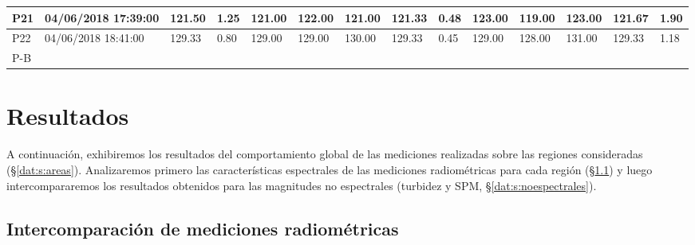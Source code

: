 \begin{table}
\begin{adjustbox}{angle=90}
\begin{tabular}{|l|l|l|l|l|l|l|l|l|l|l|l|l|l|}
        P21 & 04/06/2018 17:39:00 & 121.50 & 1.25 & 121.00 & 122.00 & 121.00 & 121.33 & 0.48 & 123.00 & 119.00 & 123.00 & 121.67 & 1.90 \\ \hline
        P22 & 04/06/2018 18:41:00 & 129.33 & 0.80 & 129.00 & 129.00 & 130.00 & 129.33 & 0.45 & 129.00 & 128.00 & 131.00 & 129.33 & 1.18 \\ \hline
        P-B &  &  &  &  &  &  &  &  &  &  &  &  &  \\ \hline
        \end{tabular}
        \end{adjustbox}
        \label{dat:tab:hach}
        \end{table}

\section{Resultados}
\label{dat:s:resultados}

    A continuación, exhibiremos los resultados del comportamiento global de las mediciones realizadas sobre las regiones consideradas (\S \ref{dat:s:areas}). Analizaremos primero las características espectrales de las mediciones radiométricas para cada región (\S \ref{dat:s:espectrales}) y luego intercompararemos los resultados obtenidos para las magnitudes no espectrales (turbidez y SPM, \S \ref{dat:s:noespectrales}).
    
    \subsection{Intercomparación de mediciones radiométricas}
    \label{dat:s:espectrales}
        
